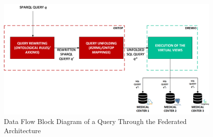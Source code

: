 \begin{figure}[ht]
    \centering
    \includegraphics[width=15cm]{res/Drawing5.png}
    \caption{Data Flow Block Diagram of a Query Through the Federated Architecture}
    \label{fig:blockdiagram}
\end{figure}

